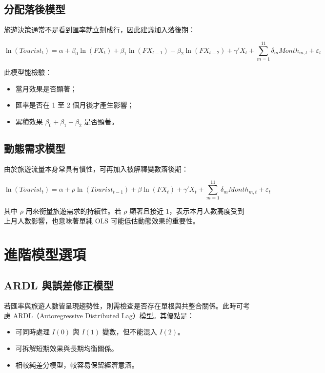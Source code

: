 \documentclass[12pt,a4paper,fontset=none]{ctexart}
\begin{document}
\subsection{分配落後模型}

旅遊決策通常不是看到匯率就立刻成行，因此建議加入落後期：

\begin{equation}
\ln(Tourist_t)
= \alpha
+ \beta_0 \ln(FX_t)
+ \beta_1 \ln(FX_{t-1})
+ \beta_2 \ln(FX_{t-2})
+ \gamma' X_t
+ \sum_{m=1}^{11} \delta_m Month_{m,t}
+ \varepsilon_t
\end{equation}

此模型能檢驗：

\begin{itemize}
  \item 當月效果是否顯著；
  \item 匯率是否在 1 至 2 個月後才產生影響；
  \item 累積效果 $\beta_0+\beta_1+\beta_2$ 是否顯著。
\end{itemize}

\subsection{動態需求模型}

由於旅遊流量本身常具有慣性，可再加入被解釋變數落後期：

\begin{equation}
\ln(Tourist_t)
= \alpha
+ \rho \ln(Tourist_{t-1})
+ \beta \ln(FX_t)
+ \gamma' X_t
+ \sum_{m=1}^{11} \delta_m Month_{m,t}
+ \varepsilon_t
\end{equation}

其中 $\rho$ 用來衡量旅遊需求的持續性。若 $\rho$ 顯著且接近 1，表示本月人數高度受到上月人數影響，也意味著單純 OLS 可能低估動態效果的重要性。

\section{進階模型選項}

\subsection{ARDL 與誤差修正模型}

若匯率與旅遊人數皆呈現趨勢性，則需檢查是否存在單根與共整合關係。此時可考慮 ARDL（Autoregressive Distributed Lag）模型。其優點是：

\begin{itemize}
  \item 可同時處理 $I(0)$ 與 $I(1)$ 變數，但不能混入 $I(2)$。
  \item 可拆解短期效果與長期均衡關係。
  \item 相較純差分模型，較容易保留經濟意涵。
\end{itemize}
\end{document}
